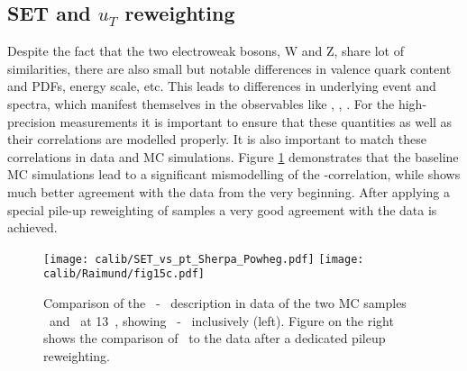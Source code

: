      \subsection{SET and $u_T$ reweighting }
     Despite the fact that the two electroweak bosons, W and Z, share  lot of similarities, there are also small but notable differences in valence quark content and PDFs, energy scale, etc. This leads to differences in underlying event and \ptv spectra, which manifest themselves in the observables like \set, \setue, \ut. For the high-precision measurements it is important to ensure that these quantities as well as their correlations are modelled properly. It is also important to match these correlations in data and MC simulations. Figure \ref{fig:setSherpa} demonstrates that the baseline \Powheg MC simulations lead to a significant mismodelling of the \setue-\ptv correlation, while \Sherpa shows much better agreement with the data from the very beginning. After applying a special pile-up reweighting of \Sherpa samples a very good agreement with the data is achieved.
     
	\begin{figure}[tp]
		\centering
			\texttt{[image: calib/SET\_vs\_pt\_Sherpa\_Powheg.pdf]}
			\texttt{[image: calib/Raimund/fig15c.pdf]}
		\caption{Comparison of the \set\ - \ptll\ description in data of the two MC
			samples \POWHEG\ and \SHERPA\ at 13~\TeV, showing \set\ - \ptll\ inclusively
			(left). Figure on the right shows the comparison of \SHERPA\ to the data after a dedicated
			pileup reweighting. }
		\label{fig:setSherpa}
	\end{figure}
	
